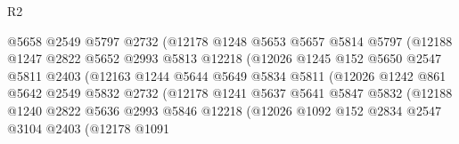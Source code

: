 \begin{lexlean}{R2}
\begin{coremodule}
                              @5658
                              @2549
                              @5797
                              @2732
                              (@12178
                                @1248
                                @5653
                                @5657
                                @5814
                                @5797
                                (@12188
                                  @1247
                                  @2822
                                  @5652
                                  @2993
                                  @5813
                                  @12218
                                  (@12026
                                    @1245
                                    @152
                                    @5650
                                    @2547
                                    @5811
                                    @2403
                                    (@12163
                                      @1244
                                      @5644
                                      @5649
                                      @5834
                                      @5811
                                      (@12026
                                        @1242
                                        @861
                                        @5642
                                        @2549
                                        @5832
                                        @2732
                                        (@12178
                                          @1241
                                          @5637
                                          @5641
                                          @5847
                                          @5832
                                          (@12188
                                            @1240
                                            @2822
                                            @5636
                                            @2993
                                            @5846
                                            @12218
                                            (@12026
                                              @1092
                                              @152
                                              @2834
                                              @2547
                                              @3104
                                              @2403
                                              (@12178
                                                @1091

\end{coremodule}
\end{lexlean}
